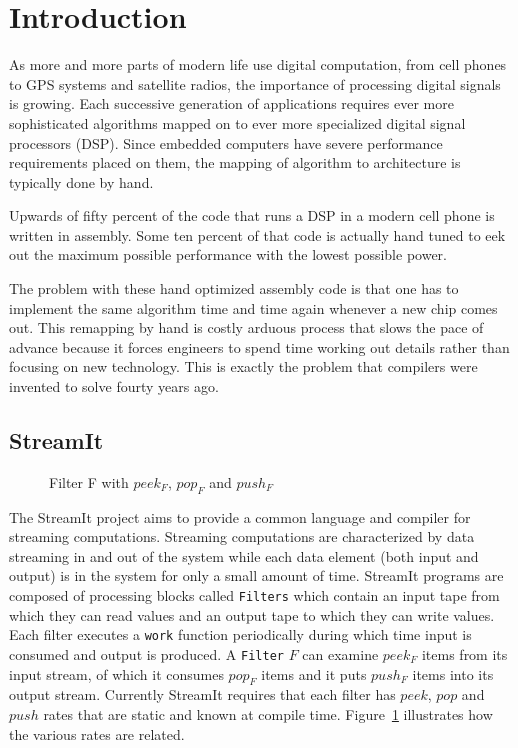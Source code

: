 \section{Introduction}
As more and more parts of modern life use digital computation, from cell phones to GPS systems
and satellite radios, the importance of processing digital signals is growing.
Each successive generation of applications requires ever more sophisticated algorithms mapped 
on to ever more specialized digital signal processors (DSP). Since embedded computers have severe performance
requirements placed on them, the mapping of algorithm to architecture is typically done by hand.

Upwards of fifty percent of the code that runs a DSP in a modern cell phone is written in assembly. Some
ten percent of that code is actually hand tuned to eek out the maximum possible performance with
the lowest possible power. 

The problem with these hand optimized assembly code is that one has to implement the same algorithm time
and time again whenever a new chip comes out. This remapping by hand is costly arduous process that 
slows the pace of advance because it forces engineers to spend time working out details rather 
than focusing on new technology. This is exactly the problem that compilers were invented to solve
fourty years ago. 

\subsection{StreamIt}

\begin{figure}
\center
\epsfxsize=2.5in
\caption{Filter F with $peek_{F}$, $pop_{F}$ and $push_{F}$}
\label{fig:overview-filter}
\end{figure}


The StreamIt\cite{thies02streamit,thies01streamit,william-stream,michal-common} project
aims to provide a common language and compiler for streaming computations. Streaming computations
are characterized by data streaming in and out of the system while each data element (both
input and output) is in the system for only a small amount of time. 
StreamIt programs are composed of processing blocks called {\tt Filters} which
contain an input tape from which they can read values and an output tape to which
they can write values. Each filter executes a {\tt work} function periodically during which
time input is consumed and output is produced. A {\tt Filter} $F$ can examine $peek_{F}$ items 
from its input stream, of which it consumes $pop_{F}$ items and it puts $push_{F}$ items into
its output stream. Currently StreamIt requires that each filter has $peek$, $pop$ and $push$ rates
that are static and known at compile time. Figure~\ref{fig:overview-filter} illustrates how the
various rates are related.


